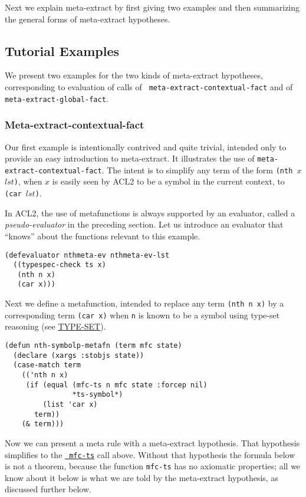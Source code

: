 Next we explain meta-extract by first giving two examples and then
summarizing the general forms of meta-extract hypotheses.

\subsection{Tutorial Examples}

We present two examples for the two kinds of meta-extract hypotheses,
corresponding to evaluation of calls of {\tt
  meta-extract-contextual-fact} and of {\tt meta-extract-global-fact}.

\subsubsection{Meta-extract-contextual-fact}

Our first example is intentionally contrived and quite trivial,
intended only to provide an easy introduction to meta-extract.  It
illustrates the use of {\tt meta-extract-contextual-fact}.  The intent
is to simplify any term of the form {\tt (nth $x$ $lst$)}, when $x$ is
easily seen by ACL2 to be a symbol in the current context, to {\tt
  (car $lst$)}.

In ACL2, the use of metafunctions is always supported by an evaluator,
called a {\em pseudo-evaluator} in the preceding section.  Let us
introduce an evaluator that ``knows'' about the functions relevant to
this example.

\begin{verbatim}
(defevaluator nthmeta-ev nthmeta-ev-lst
  ((typespec-check ts x)
   (nth n x)
   (car x)))
\end{verbatim}

\noindent Next we define a metafunction, intended to replace any term
{\tt (nth n x)} by a corresponding term {\tt (car x)} when {\tt n} is
known to be a symbol using type-set reasoning (see
\href{http://www.cs.utexas.edu/users/moore/acl2/manuals/current/manual/index.html?topic=ACL2\_\_\_\_TYPE-SET}{\underline{TYPE-SET}}).

\begin{verbatim}
(defun nth-symbolp-metafn (term mfc state)
  (declare (xargs :stobjs state))
  (case-match term
    (('nth n x)
     (if (equal (mfc-ts n mfc state :forcep nil)
                *ts-symbol*)
         (list 'car x)
       term))
    (& term)))
\end{verbatim}

\noindent Now we can present a meta rule with a meta-extract
hypothesis.  That hypothesis simplifies to the
\href{http://www.cs.utexas.edu/users/moore/acl2/manuals/current/manual/index.html?topic=ACL2\_\_\_\_MFC-TS}{\underline{\tt
    mfc-ts}} call above.  Without that hypothesis the formula below is
not a theorem, because the function {\tt mfc-ts} has no axiomatic
properties; all we know about it below is what we are told by the
meta-extract hypothesis, as discussed further below.

